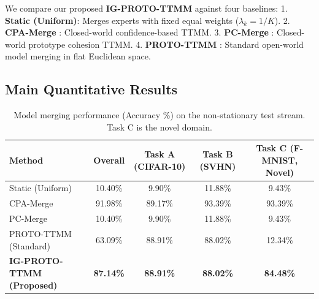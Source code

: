 \documentclass{article}
\theoremstyle{plain}
\theoremstyle{definition}
\theoremstyle{remark}
\begin{document}
We compare our proposed \textbf{IG-PROTO-TTMM} against four baselines:
1. \textbf{Static (Uniform)}: Merges experts with fixed equal weights ($\lambda_k = 1/K$).
2. \textbf{CPA-Merge} \cite{authors2026c}: Closed-world confidence-based TTMM.
3. \textbf{PC-Merge} \cite{authors2026b}: Closed-world prototype cohesion TTMM.
4. \textbf{PROTO-TTMM} \cite{authors2026a}: Standard open-world model merging in flat Euclidean space.

\subsection{Main Quantitative Results}

\begin{table}[t]
\caption{Model merging performance (Accuracy \%) on the non-stationary test stream. Task C is the novel domain.}
\label{tab:baselines}
\vskip 0.15in
\begin{center}
\begin{small}
\begin{sc}
\begin{tabular}{lcccc}
\toprule
Method & Overall & Task A (CIFAR-10) & Task B (SVHN) & Task C (F-MNIST, Novel) \\
\midrule
Static (Uniform) & 10.40\% & 9.90\% & 11.88\% & 9.43\% \\
CPA-Merge & 91.98\% & 89.17\% & 93.39\% & 93.39\% \\
PC-Merge & 10.40\% & 9.90\% & 11.88\% & 9.43\% \\
PROTO-TTMM (Standard) & 63.09\% & 88.91\% & 88.02\% & 12.34\% \\
\midrule
\textbf{IG-PROTO-TTMM (Proposed)} & \textbf{87.14\%} & \textbf{88.91\%} & \textbf{88.02\%} & \textbf{84.48\%} \\
\bottomrule
\end{tabular}
\end{sc}
\end{small}
\end{center}
\vskip -0.1in
\end{table}
\end{document}
